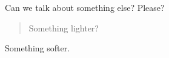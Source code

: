Can we talk about something else? Please?

\begin{quote}
Something lighter?
\end{quote}

Something softer.

